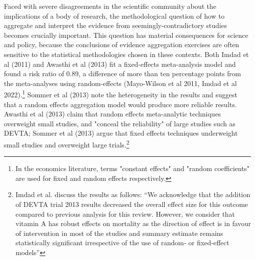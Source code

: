 \documentclass[12pt]{article}
\begin{document}
Faced with severe disagreements in the scientific community about the implications of a body of research, the methodological question of how to aggregate and interpret the evidence from seemingly-contradictory studies becomes crucially important. This question has material consequences for science and policy, because the conclusions of evidence aggregation exercises are often sensitive to the statistical methodologies chosen in these contexts. Both Imdad et al (2011) and Awasthi et al (2013) fit a fixed-effects meta-analysis model and found a risk ratio of 0.89, a difference of more than ten percentage points from the meta-analyses using random-effects (Mayo-Wilson et al 2011, Imdad et al 2022).\footnote{In the economics literature, terms "constant effects" and "random coefficients" are used for fixed and random effects respectively.} Sommer et al (2013) note the heterogeneity in the results and suggest that a random effects aggregation model would produce more reliable results. Awasthi et al (2013) claim that random effects meta-analytic techniques overweight small studies, and "conceal the reliability" of large studies such as DEVTA; Sommer et al (2013) argue that fixed effects techniques underweight small studies and overweight large trials.\footnote{Imdad et al. discuss the results as follows: ``We acknowledge that the addition of DEVTA trial 2013 results decreased the overall effect size for this outcome compared to previous analysis for this review. However, we consider that vitamin A has robust effects on mortality as the direction of effect is in favour of intervention in most of the studies and summary estimate remains statistically significant irrespective of the use of random‐ or fixed‐effect models''} 
\end{document}
